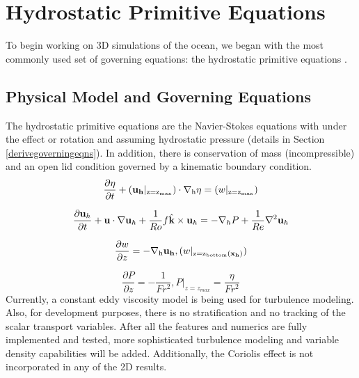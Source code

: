 \chapter[Hydrostatic Primitive Equations]{Hydrostatic Primitive Equations}
\label{chapter:4}

To begin working on 3D simulations of the ocean, we began with the most commonly used set of governing equations: the hydrostatic primitive equations \cite{96Mcw}.  

\section{Physical Model and Governing Equations}

The hydrostatic primitive equations are the Navier-Stokes equations with under the effect or rotation and assuming hydrostatic pressure (details in Section \ref{derivegoverningeqns}).  In addition, there is conservation of mass (incompressible) and an open lid condition governed by a kinematic boundary condition.  
%
\begin{equation*}\label{e:seasurfaceheight}
\frac{\partial \eta}{\partial t} + ({\bf u_h} |_{\rm z=z_{max}}) \cdot \nabla_{\rm h} \eta  =  (w|_{\rm z=z_{max}})
\end{equation*}

\begin{equation*} \label{e:momentum}
\frac{\partial {\bf u}_{h}}{\partial t} + {\bf u} \cdot \nabla {\bf u}_{h} + \frac{1}{Ro} f \hat{\bf k} \times {\bf u}_{h}= -\nabla_{h} P + \frac{1}{Re} \nabla ^{2} {\bf u}_{h}
\end{equation*}

\begin{equation*}\label{e:continuity}
 \frac{\partial w}{\partial z} = - \nabla_{\rm h}{\bf u_h}, (w|_{\rm z=z_{bottom}({\bf x_{h}})})
\end{equation*}

\begin{equation*}\label{e:hydrostaticpressure}
\frac{\partial P}{\partial z} = -\frac{1}{Fr^{2}}, P|_{z=z_{max}} = \frac{\eta}{Fr^{2}}
\end{equation*}
%
Currently, a constant eddy viscosity model is being used for turbulence modeling.  Also, for development purposes, there is no stratification and no tracking of the scalar transport variables.  After all the features and numerics are fully implemented and tested, more sophisticated turbulence modeling and variable density capabilities will be added.  Additionally, the Coriolis effect is not incorporated in any of the 2D results.

